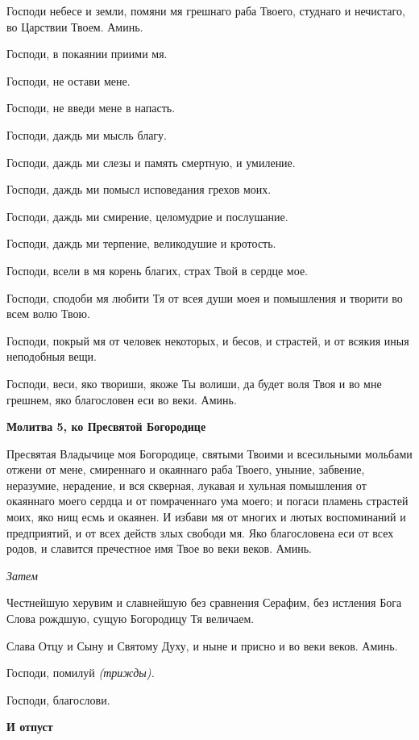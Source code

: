 Господи небесе и земли, помяни мя грешнаго раба Твоего, студнаго и нечистаго, во Царствии Твоем. Аминь.


Господи, в покаянии приими мя.


Господи, не остави мене.


Господи, не введи мене в напасть.


Господи, даждь ми мысль благу.


Господи, даждь ми слезы и память смертную, и умиление.


Господи, даждь ми помысл исповедания грехов моих.


Господи, даждь ми смирение, целомудрие и послушание.


Господи, даждь ми терпение, великодушие и кротость.


Господи, всели в мя корень благих, страх Твой в сердце мое.


Господи, сподоби мя любити Тя от всея души моея и помышления и творити во всем волю Твою.


Господи, покрый мя от человек некоторых, и бесов, и страстей, и от всякия иныя неподобныя вещи.


Господи, веси, яко твориши, якоже Ты волиши, да будет воля Твоя и во мне грешнем, яко благословен еси во веки. Аминь.




\bfseries Молитва 5, ко Пресвятой Богородице\normalfont{}


Пресвятая Владычице моя Богородице, святыми Твоими и всесильными мольбами отжени от мене, смиреннаго и окаяннаго раба Твоего, уныние, забвение, неразумие, нерадение, и вся скверная, лукавая и хульная помышления от окаяннаго моего сердца и от помраченнаго ума моего; и погаси пламень страстей моих, яко нищ есмь и окаянен. И избави мя от многих и лютых воспоминаний и предприятий, и от всех действ злых свободи мя. Яко благословена еси от всех родов, и славится пречестное имя Твое во веки веков. Аминь.


\itshape Затем \normalfont{}


Честнейшую херувим и славнейшую без сравнения Серафим, без истления Бога Слова рождшую, сущую Богородицу Тя величаем. 


Слава Отцу и Сыну и Святому Духу, и ныне и присно и во веки веков. Аминь.


Господи, помилуй \itshape (трижды)\normalfont{}. 


Господи, благослови. 




\bfseries И отпуст\normalfont{}


